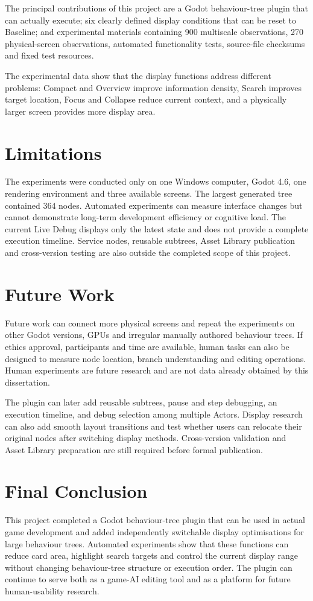 The principal contributions of this project are a Godot behaviour-tree plugin that can actually execute; six clearly defined display conditions that can be reset to Baseline; and experimental materials containing 900 multiscale observations, 270 physical-screen observations, automated functionality tests, source-file checksums and fixed test resources.

The experimental data show that the display functions address different problems: Compact and Overview improve information density, Search improves target location, Focus and Collapse reduce current context, and a physically larger screen provides more display area.

\section{Limitations}

The experiments were conducted only on one Windows computer, Godot 4.6, one rendering environment and three available screens. The largest generated tree contained 364 nodes. Automated experiments can measure interface changes but cannot demonstrate long-term development efficiency or cognitive load. The current Live Debug displays only the latest state and does not provide a complete execution timeline. Service nodes, reusable subtrees, Asset Library publication and cross-version testing are also outside the completed scope of this project.

\section{Future Work}

Future work can connect more physical screens and repeat the experiments on other Godot versions, GPUs and irregular manually authored behaviour trees. If ethics approval, participants and time are available, human tasks can also be designed to measure node location, branch understanding and editing operations. Human experiments are future research and are not data already obtained by this dissertation.

The plugin can later add reusable subtrees, pause and step debugging, an execution timeline, and debug selection among multiple Actors. Display research can also add smooth layout transitions and test whether users can relocate their original nodes after switching display methods. Cross-version validation and Asset Library preparation are still required before formal publication.

\section{Final Conclusion}

This project completed a Godot behaviour-tree plugin that can be used in actual game development and added independently switchable display optimisations for large behaviour trees. Automated experiments show that these functions can reduce card area, highlight search targets and control the current display range without changing behaviour-tree structure or execution order. The plugin can continue to serve both as a game-AI editing tool and as a platform for future human-usability research.
